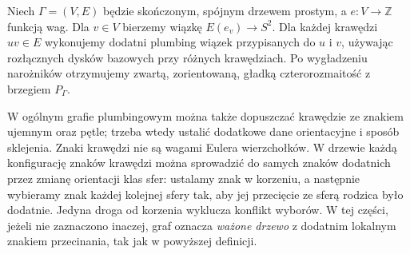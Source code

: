 \begin{center}
\end{center}

\begin{definicja}
Niech $\Gamma=(V,E)$ będzie skończonym, spójnym drzewem
prostym, a $e\colon V\to\mathbb Z$ funkcją wag.
Dla $v\in V$ bierzemy wiązkę $E(e_v)\to S^2$.
Dla każdej krawędzi $uv\in E$ wykonujemy dodatni plumbing
wiązek przypisanych do $u$ i $v$, używając rozłącznych
dysków bazowych przy różnych krawędziach. Po wygładzeniu
narożników otrzymujemy zwartą, zorientowaną, gładką
czterorozmaitość z brzegiem $P_\Gamma$.
\end{definicja}

W ogólnym grafie plumbingowym można także dopuszczać
krawędzie ze znakiem ujemnym oraz pętle; trzeba
wtedy ustalić dodatkowe dane orientacyjne i sposób
sklejenia. Znaki krawędzi nie są wagami Eulera
wierzchołków. W drzewie każdą konfigurację znaków
krawędzi można sprowadzić do samych znaków dodatnich
przez zmianę orientacji klas sfer: ustalamy znak
w korzeniu, a następnie wybieramy znak każdej
kolejnej sfery tak, aby jej przecięcie ze sferą
rodzica było dodatnie. Jedyna droga od korzenia
wyklucza konflikt wyborów. W tej części, jeżeli nie
zaznaczono inaczej, graf oznacza \emph{ważone drzewo} z dodatnim
lokalnym znakiem przecinania, tak jak w powyższej definicji.

